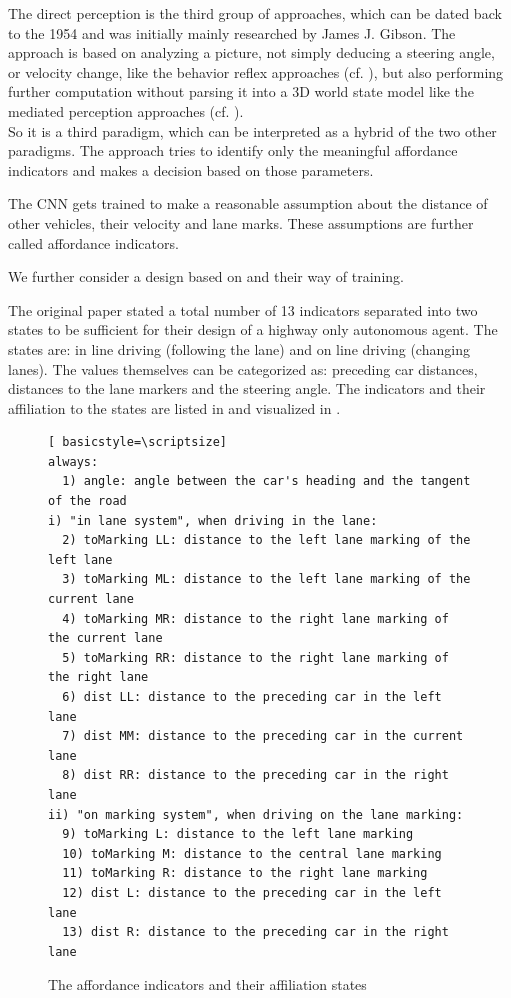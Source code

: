 The direct perception is the third group of approaches, which can be dated back to the 1954 and was initially mainly researched by James J. Gibson. \cite{gibson1954theory} The approach is based on analyzing a picture, not simply deducing a steering angle, or velocity change, like the behavior reflex approaches (cf. ), but also performing further computation without parsing it into a 3D world state model like the mediated perception approaches (cf. ). \cite{chen2015deepdriving}\\
So it is a third paradigm, which can be interpreted as a hybrid of the two other paradigms. The approach tries to identify only the meaningful affordance indicators and makes a decision based on those parameters. 

The CNN gets trained to make a reasonable assumption about the distance of other vehicles, their velocity and lane marks. These assumptions are further called affordance indicators.

We further consider a design based on \cite{chen2015deepdriving} and their way of training.

The original paper \cite{chen2015deepdriving} stated a total number of 13 indicators separated into two states to be sufficient for their design of a highway only autonomous agent. The states are: in line driving (following the lane) and on line driving (changing lanes). The values themselves can be categorized as: preceding car distances, distances to the lane markers and the steering angle. The indicators and their affiliation to the states are listed in  and visualized in .

\begin{figure}
\centering
\todoLine
\begin{lstlisting}[ basicstyle=\scriptsize]
always:
  1) angle: angle between the car's heading and the tangent of the road
i) "in lane system", when driving in the lane:
  2) toMarking LL: distance to the left lane marking of the left lane
  3) toMarking ML: distance to the left lane marking of the current lane
  4) toMarking MR: distance to the right lane marking of the current lane
  5) toMarking RR: distance to the right lane marking of the right lane
  6) dist LL: distance to the preceding car in the left lane
  7) dist MM: distance to the preceding car in the current lane
  8) dist RR: distance to the preceding car in the right lane
ii) "on marking system", when driving on the lane marking:
  9) toMarking L: distance to the left lane marking
  10) toMarking M: distance to the central lane marking
  11) toMarking R: distance to the right lane marking
  12) dist L: distance to the preceding car in the left lane
  13) dist R: distance to the preceding car in the right lane
\end{lstlisting}

\todoLine
\caption{The affordance indicators and their affiliation states}
\label{lst: affordance indicators}
\end{figure}

